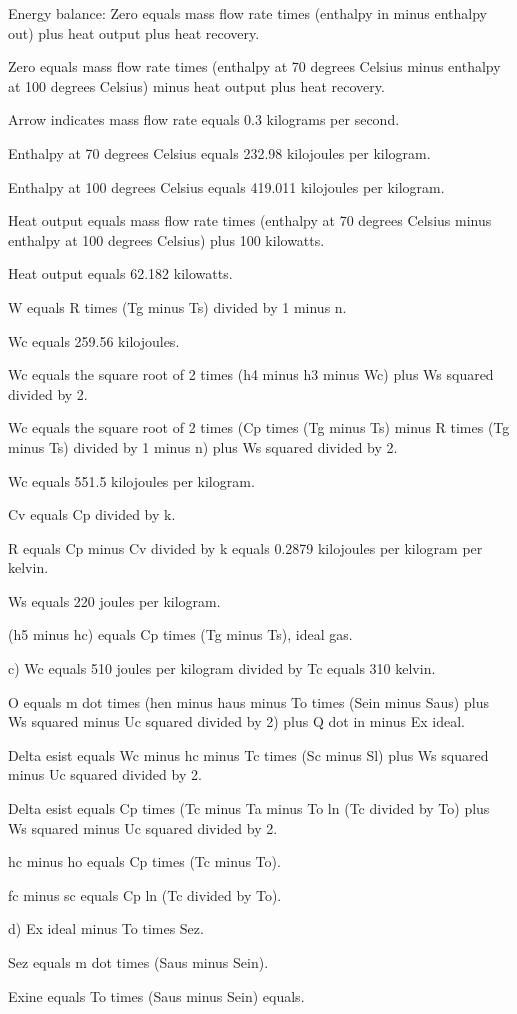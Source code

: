 Energy balance:
Zero equals mass flow rate times (enthalpy in minus enthalpy out) plus heat output plus heat recovery.

Zero equals mass flow rate times (enthalpy at 70 degrees Celsius minus enthalpy at 100 degrees Celsius) minus heat output plus heat recovery.

Arrow indicates mass flow rate equals 0.3 kilograms per second.

Enthalpy at 70 degrees Celsius equals 232.98 kilojoules per kilogram.

Enthalpy at 100 degrees Celsius equals 419.011 kilojoules per kilogram.

Heat output equals mass flow rate times (enthalpy at 70 degrees Celsius minus enthalpy at 100 degrees Celsius) plus 100 kilowatts.

Heat output equals 62.182 kilowatts.

W equals R times (Tg minus Ts) divided by 1 minus n.

Wc equals 259.56 kilojoules.

Wc equals the square root of 2 times (h4 minus h3 minus Wc) plus Ws squared divided by 2.

Wc equals the square root of 2 times (Cp times (Tg minus Ts) minus R times (Tg minus Ts) divided by 1 minus n) plus Ws squared divided by 2.

Wc equals 551.5 kilojoules per kilogram.

Cv equals Cp divided by k.

R equals Cp minus Cv divided by k equals 0.2879 kilojoules per kilogram per kelvin.

Ws equals 220 joules per kilogram.

(h5 minus hc) equals Cp times (Tg minus Ts), ideal gas.

c) Wc equals 510 joules per kilogram divided by Tc equals 310 kelvin.

O equals m dot times (hen minus haus minus To times (Sein minus Saus) plus Ws squared minus Uc squared divided by 2) plus Q dot in minus Ex ideal.

Delta esist equals Wc minus hc minus Tc times (Sc minus Sl) plus Ws squared minus Uc squared divided by 2.

Delta esist equals Cp times (Tc minus Ta minus To ln (Tc divided by To) plus Ws squared minus Uc squared divided by 2.

hc minus ho equals Cp times (Tc minus To).

fc minus sc equals Cp ln (Tc divided by To).

d) Ex ideal minus To times Sez.

Sez equals m dot times (Saus minus Sein).

Exine equals To times (Saus minus Sein) equals.